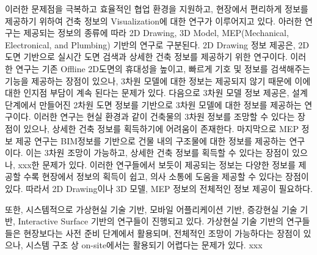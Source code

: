 이러한 문제점을 극복하고 효율적인 협업 환경을 지원하고, 현장에서 편리하게 정보를 제공하기 위하여 건축 정보의 Visualization에 대한 연구가 이루어지고 있다. 아러한 연구는 제공되는 정보의 종류에 따라 2D Drawing, 3D Model, MEP(Mechanical, Electronical, and Plumbing) 기반의 연구로 구분된다\cite{ebbesen_information_2015}. 2D Drawing 정보 제공\cite{yeh_-site_2012,ishii_augmented_2002,cote_augmented_2013}은, 2D 도면 기반으로 실시간 도면 검색과 상세한 건축 정보를 제공하기 위한 연구이다. 이러한 연구는 기존 Offline 2D도면의 휴대성을 높이고, 빠르게 기호 및 정보를 검색해주는 기능을 제공하는 장점이 있으나, 3차원 모델에 대한 정보는 제공되지 않기 때문에 이에 대한 인지점 부담이 계속 된다는 문제가 있다. 다음으로 3차원 모델 정보 제공은, 설계 단계에서 만들어진 2차원 도면 정보를 기반으로 3차원 모델에 대한 정보를 제공하는 연구이다\cite{wagner_building_2012,dong_collaborative_2013, hou_combining_2014,behzadan_ubiquitous_2008}. 이러한 연구는 현실 환경과 같이 건축물의 3차원 정보를 조망할 수 있다는 장점이 있으나, 상세한 건축 정보를 획득하기에 어려움이 존재한다. 마지막으로 MEP 정보 제공 연구\cite{schall_handheld_2009,olbrich_augmented_2013,kwon_defect_2014}는 BIM정보를 기반으로 건물 내의 구조물에 대한 정보를 제공하는 연구이다. 이는 3차원 조망이 가능하고, 상세한 건축 정보를 획득할 수 있다는 장점이 있으나, xxx한 문제가 있다. 이러한 연구들에서 보듯이 제공되는 정보는 다양한 정보를 제공할 수록 현장에서 정보의 획득이 쉽고, 의사 소통에 도움을 제공할 수 있다는 장점이 있다. 따라서 2D Drawing이나 3D 모델, MEP 정보의 전체적인 정보 제공이 필요하다. 

또한, 시스템적으로 가상현실 기술 기반, 모바일 어플리케이션 기반, 증강현실 기술 기반, Interactive Surface 기반의 연구들이 진행되고 있다. 가상현실 기술 기반의 연구들\cite{lin_using_2014,dong_collaborative_2013}들은 현장보다는 사전 준비 단계에서 활용되며, 전체적인 조망이 가능하다는 장점이 있으나, 시스템 구조 상 on-site에서는 활용되기 어렵다는 문제가 있다. xxx





